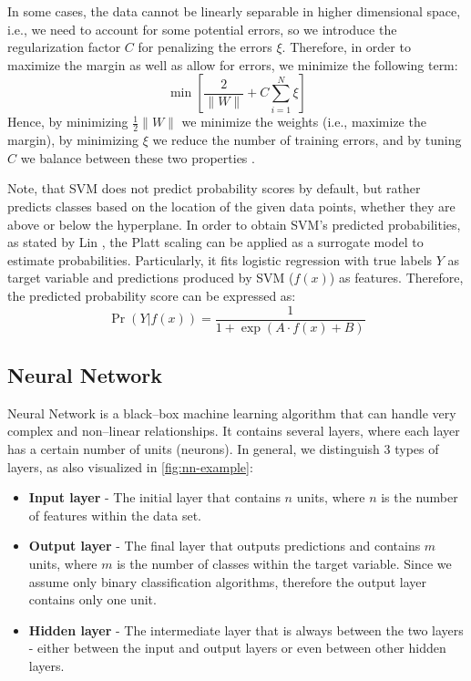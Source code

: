 In some cases, the data cannot be linearly separable in higher dimensional space, i.e., we need to account for some potential errors, so we introduce the regularization factor $C$ for penalizing the errors $\xi$.
Therefore, in order to maximize the margin as well as allow for errors, we minimize the following term:
\begin{equation}
    \min \left[\frac{2}{\|W\|} + C \sum_{i=1}^{N} \xi\right]
\end{equation}
Hence, by minimizing $\frac{1}{2} \|W\|$ we minimize the weights (i.e., maximize the margin), by minimizing $\xi$ we reduce the number of training errors, and by tuning $C$ we balance between these two properties \citep{hsu2002comparison}.


Note, that SVM does not predict probability scores by default, but rather predicts classes based on the location of the given data points, whether they are above or below the hyperplane.
In order to obtain SVM's predicted probabilities, as stated by Lin \citep{lin2007note}, the Platt scaling \citep{platt1999probabilistic} can be applied as a surrogate model to estimate probabilities. Particularly, it fits logistic regression with true labels $Y$ as target variable and predictions produced by SVM ($f(x)$) as features. Therefore, the predicted probability score can be expressed as:
\begin{equation}
    \operatorname{Pr}\left(Y | f(x) \right) = \frac{1}{1 + \exp\left(A \cdot f(x) + B \right)} 
\end{equation}


\subsection{Neural Network}
\label{subssec:nn}
Neural Network is a black--box machine learning algorithm that can handle very complex and non--linear relationships. It contains several layers, where each layer has a certain number of units (neurons). In general, we distinguish 3 types of layers, as also visualized in \autoref{fig:nn-example}:
\begin{itemize}\setlength\itemsep{0em}
     \item \textbf{Input layer} - The initial layer that contains $n$ units, where $n$ is the number of features within the data set.
    \item \textbf{Output layer} - The final layer that outputs predictions and contains $m$ units, where $m$ is the number of classes within the target variable. Since we assume only binary classification algorithms, therefore the output layer contains only one unit.
 \item \textbf{Hidden layer} - The intermediate layer that is always between the two layers - either between the input and output layers or even between other hidden layers.
 \end{itemize}


